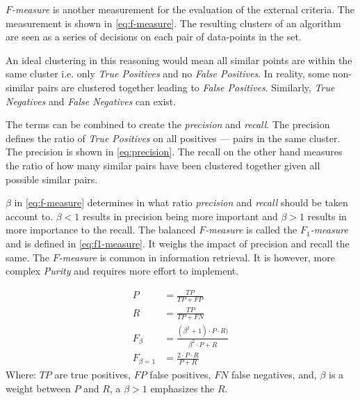 \documentclass[../report.tex]{subfiles}
\begin{document}
\textit{$F$-measure} is another measurement for the evaluation of the external criteria. The measurement is shown in \ref{eq:f-measure}\cite{manning2010introduction}. The resulting clusters of an algorithm are seen as a series of decisions on each pair of data-points in the set.

An ideal clustering in this reasoning would mean all similar points are within the same cluster i.e. only \textit{True Positives} and no \textit{False Positives}. In reality, some non-similar pairs are clustered together leading to \textit{False Positives}. Similarly, \textit{True Negatives} and \textit{False Negatives} can exist.

The terms can be combined to create the \textit{precision} and \textit{recall}. The precision defines the ratio of \textit{True Positives} on all positives --- pairs in the same cluster. The precision is shown in \ref{eq:precision}. The recall on the other hand measures the ratio of how many similar pairs have been clustered together given all possible similar pairs. 

$\beta$ in \ref{eq:f-measure} determines in what ratio \textit{precision} and \textit{recall} should be taken account to. $\beta < 1$ results in precision being more important and $\beta > 1$ results in more importance to the recall. The balanced \textit{$F$-measure} is called the \textit{$F_1$-measure} and is defined in \ref{eq:f1-measure}. It weighs the impact of precision and recall the same. The \textit{$F$-measure} is common in information retrieval. It is however, more complex \textit{Purity} and requires more effort to implement.

\begin{align}
  \label{eq:precision}
  P &= \frac{TP}{TP+FP} \\
  \label{eq:recall}
  R &= \frac{TP}{TP+FN} \\
  \label{eq:f-measure}
  F_\beta &= \frac{(\beta^2 + 1) \cdot P \cdot R)}{\beta^2 \cdot P + R} \\
  \label{eq:f1-measure}
  F_{\beta = 1} &= \frac{2 \cdot P \cdot R}{P + R}
\end{align}
Where:\newline
$TP$ are true positives, $FP$ false positives, $FN$ false negatives, and, $\beta$ is a weight between $P$ and $R$, a $\beta > 1$ emphasizes the $R$.
\end{document}
